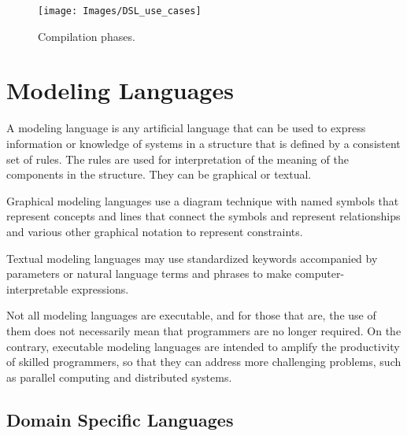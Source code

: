 \documentclass[11pt]{report}
\begin{document}
	\begin{figure} [H]
		\centering
		\texttt{[image: Images/DSL\_use\_cases]}
		\caption{Compilation phases.}
		\label{fig:compiler-sequence}
	\end{figure}

	\section{Modeling Languages}
	\par A modeling language is any artificial language that can be used to express information or knowledge of systems in a structure that is defined by a consistent set of rules. The rules are used for interpretation of the meaning of the components in the structure. They can be graphical or textual.
	\par Graphical modeling languages use a diagram technique with named symbols that represent concepts and lines that connect the symbols and represent relationships and various other graphical notation to represent constraints.
	\par Textual modeling languages may use standardized keywords accompanied by parameters or natural language terms and phrases to make computer-interpretable expressions.
	\par Not all modeling languages are executable, and for those that are, the use of them does not necessarily mean that programmers are no longer required. On the contrary, executable modeling languages are intended to amplify the productivity of skilled programmers, so that they can address more challenging problems, such as parallel computing and distributed systems\cite{wikipedia}.
		
		\subsection{Domain Specific Languages}
		
\end{document}
